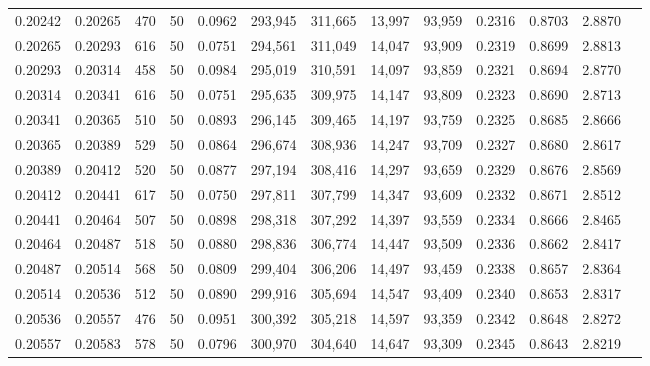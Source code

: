 \begin{tabular}{rrrrrrrrrrrrr}
0.20242 & 0.20265 &   470 &  50 &                                     0.0962 & 293,945 & 311,665 &  13,997 &  93,959 & 0.2316 & 0.8703 & 2.8870 \\
0.20265 & 0.20293 &   616 &  50 &                                     0.0751 & 294,561 & 311,049 &  14,047 &  93,909 & 0.2319 & 0.8699 & 2.8813 \\
0.20293 & 0.20314 &   458 &  50 &                                     0.0984 & 295,019 & 310,591 &  14,097 &  93,859 & 0.2321 & 0.8694 & 2.8770 \\
0.20314 & 0.20341 &   616 &  50 &                                     0.0751 & 295,635 & 309,975 &  14,147 &  93,809 & 0.2323 & 0.8690 & 2.8713 \\
0.20341 & 0.20365 &   510 &  50 &                                     0.0893 & 296,145 & 309,465 &  14,197 &  93,759 & 0.2325 & 0.8685 & 2.8666 \\
0.20365 & 0.20389 &   529 &  50 &                                     0.0864 & 296,674 & 308,936 &  14,247 &  93,709 & 0.2327 & 0.8680 & 2.8617 \\
0.20389 & 0.20412 &   520 &  50 &                                     0.0877 & 297,194 & 308,416 &  14,297 &  93,659 & 0.2329 & 0.8676 & 2.8569 \\
0.20412 & 0.20441 &   617 &  50 &                                     0.0750 & 297,811 & 307,799 &  14,347 &  93,609 & 0.2332 & 0.8671 & 2.8512 \\
0.20441 & 0.20464 &   507 &  50 &                                     0.0898 & 298,318 & 307,292 &  14,397 &  93,559 & 0.2334 & 0.8666 & 2.8465 \\
0.20464 & 0.20487 &   518 &  50 &                                     0.0880 & 298,836 & 306,774 &  14,447 &  93,509 & 0.2336 & 0.8662 & 2.8417 \\
0.20487 & 0.20514 &   568 &  50 &                                     0.0809 & 299,404 & 306,206 &  14,497 &  93,459 & 0.2338 & 0.8657 & 2.8364 \\
0.20514 & 0.20536 &   512 &  50 &                                     0.0890 & 299,916 & 305,694 &  14,547 &  93,409 & 0.2340 & 0.8653 & 2.8317 \\
0.20536 & 0.20557 &   476 &  50 &                                     0.0951 & 300,392 & 305,218 &  14,597 &  93,359 & 0.2342 & 0.8648 & 2.8272 \\
0.20557 & 0.20583 &   578 &  50 &                                     0.0796 & 300,970 & 304,640 &  14,647 &  93,309 & 0.2345 & 0.8643 & 2.8219 \\

\end{tabular}
